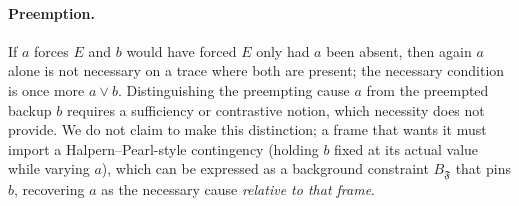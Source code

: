 \documentclass[11pt]{article}
\theoremstyle{remark}
\newcommand{\Frame}{\mathfrak{F}}
\begin{document}
\paragraph{Preemption.} If \(a\) forces \(E\) and \(b\) would have forced \(E\)
only had \(a\) been absent, then again \(a\) alone is not necessary on a trace
where both are present; the necessary condition is once more
\(a\lor b\). Distinguishing the preempting cause \(a\) from the preempted backup
\(b\) requires a sufficiency or contrastive notion, which necessity does not
provide. We do not claim to make this distinction; a frame that wants it must
import a Halpern--Pearl-style contingency (holding \(b\) fixed at its actual
value while varying \(a\)), which can be expressed as a background constraint
\(B_{\Frame}\) that pins \(b\), recovering \(a\) as the necessary cause
\emph{relative to that frame}.
\end{document}

